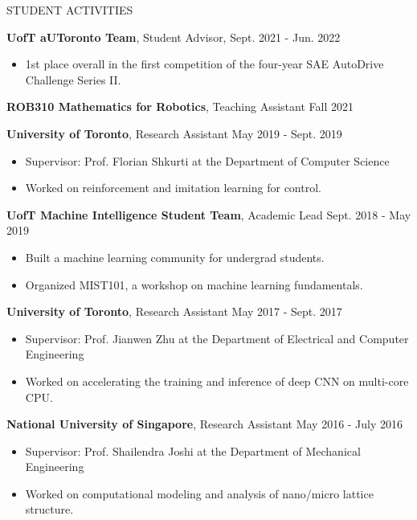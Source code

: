 \documentclass{cv}
\begin{document}
\begin{rSection}{STUDENT ACTIVITIES}
  \item \textbf{UofT aUToronto Team}, Student Advisor,  \hfill Sept. 2021 - Jun. 2022
  \vspace{-0.25em}
  \begin{itemize}[noitemsep,topsep=0pt]
    \item 1st place overall in the first competition of the four-year SAE AutoDrive Challenge Series II.
  \end{itemize}
  \item \textbf{ROB310 Mathematics for Robotics}, Teaching Assistant \hfill Fall 2021
  \item \textbf{University of Toronto}, Research Assistant \hfill May 2019 - Sept. 2019
  \vspace{-0.25em}
  \begin{itemize}[noitemsep,topsep=0pt]
    \item Supervisor: Prof. Florian Shkurti at the Department of Computer Science
    \item Worked on reinforcement and imitation learning for control.
  \end{itemize}
  \item \textbf{UofT Machine Intelligence Student Team}, Academic Lead \hfill Sept. 2018 - May 2019
  \vspace{-0.25em}
  \begin{itemize}[noitemsep,topsep=0pt]
    \item Built a machine learning community for undergrad students.
    \item Organized MIST101, a workshop on machine learning fundamentals.
  \end{itemize}
  \item \textbf{University of Toronto}, Research Assistant \hfill May 2017 - Sept. 2017
  \vspace{-0.25em}
  \begin{itemize}[noitemsep,topsep=0pt]
    \item Supervisor: Prof. Jianwen Zhu at the Department of Electrical and Computer Engineering
    \item Worked on accelerating the training and inference of deep CNN on multi-core CPU.
  \end{itemize}
  \item \textbf{National University of Singapore}, Research Assistant \hfill May 2016 - July 2016
  \vspace{-0.25em}
  \begin{itemize}[noitemsep,topsep=0pt]
    \item Supervisor: Prof. Shailendra Joshi at the Department of Mechanical Engineering
    \item Worked on computational modeling and analysis of nano/micro lattice structure.
  \end{itemize}
\end{rSection}
\end{document}
